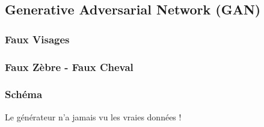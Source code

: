 \subsection{Generative Adversarial Network (\textbf{GAN})}

\begin{frame}
  \frametitle{Faux Visages}
\end{frame}

\begin{frame}
  \frametitle{Faux Zèbre - Faux Cheval}
\end{frame}

\begin{frame}
  \frametitle{Schéma}
  Le générateur n'a jamais vu les vraies données !
\end{frame}


